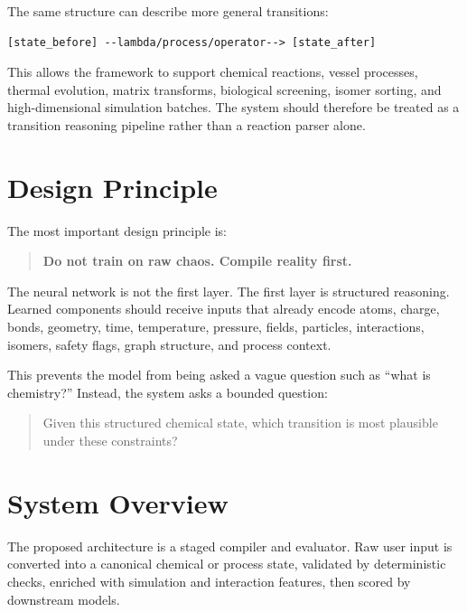 \documentclass[11pt]{article}
\begin{document}
The same structure can describe more general transitions:

\begin{lstlisting}[caption={Generalized process transition}]
[state_before] --lambda/process/operator--> [state_after]
\end{lstlisting}

This allows the framework to support chemical reactions, vessel processes, thermal evolution, matrix transforms, biological screening, isomer sorting, and high-dimensional simulation batches. The system should therefore be treated as a transition reasoning pipeline rather than a reaction parser alone.

\section{Design Principle}

The most important design principle is:

\begin{quote}
\textbf{Do not train on raw chaos. Compile reality first.}
\end{quote}

The neural network is not the first layer. The first layer is structured reasoning. Learned components should receive inputs that already encode atoms, charge, bonds, geometry, time, temperature, pressure, fields, particles, interactions, isomers, safety flags, graph structure, and process context.

This prevents the model from being asked a vague question such as ``what is chemistry?'' Instead, the system asks a bounded question:

\begin{quote}
Given this structured chemical state, which transition is most plausible under these constraints?
\end{quote}

\section{System Overview}

The proposed architecture is a staged compiler and evaluator. Raw user input is converted into a canonical chemical or process state, validated by deterministic checks, enriched with simulation and interaction features, then scored by downstream models.
\end{document}
